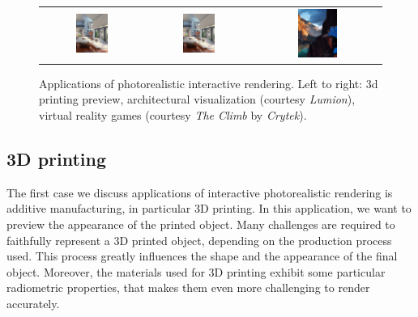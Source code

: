 \begin{figure}
\centering
\begin{tabular}{@{}c@{}c@{}c@{}}
	 \includegraphics[draft,width=0.33\textwidth]{figures/lumion-crop.jpg} & 	 \includegraphics[width=0.33\textwidth]{figures/lumion-crop.jpg} 
& 	 \includegraphics[width=0.33\textwidth]{figures/the-climb-crop.jpg} \\
\end{tabular}
\caption{Applications of photorealistic interactive rendering. Left to right: 3d printing preview, architectural visualization (courtesy \emph{Lumion}), virtual reality games (courtesy \emph{The Climb} by \emph{Crytek}).} 
\label{fig:applications}
\end{figure}

\subsection{3D printing}
The first case we discuss applications of interactive photorealistic rendering is additive manufacturing, in particular 3D printing. In this application, we want to preview the appearance of the printed object. Many challenges are required to faithfully represent a 3D printed object, depending on the production process used. This process greatly influences the shape and the appearance of the final object. Moreover, the materials used for 3D printing exhibit some particular radiometric properties, that makes them even more challenging to render accurately. 

